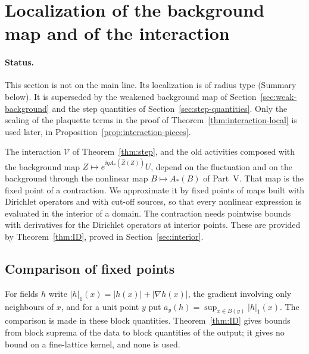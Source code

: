 \section{Localization of the background map and of the interaction}\label{sec:interaction-local}

\paragraph{Status.} This section is not on the main line. Its localization is of radius type (Summary below). It is superseded by the weakened background map of Section~\ref{sec:weak-background} and the step quantities of Section~\ref{sec:step-quantities}. Only the scaling of the plaquette terms in the proof of Theorem~\ref{thm:interaction-local} is used later, in Proposition~\ref{prop:interaction-pieces}.

The interaction $\mathcal V$ of Theorem~\ref{thm:step}, and the old activities composed with the background map $Z\mapsto e^{\ii\eta A_*(\hat Z(Z))}U$, depend on the fluctuation and on the background through the nonlinear map $B\mapsto A_*(B)$ of Part~V. That map is the fixed point of a contraction. We approximate it by fixed points of maps built with Dirichlet operators and with cut-off sources, so that every nonlinear expression is evaluated in the interior of a domain. The contraction needs pointwise bounds with derivatives for the Dirichlet operators at interior points. These are provided by Theorem~\ref{thm:ID}, proved in Section~\ref{sec:interior}.

\subsection{Comparison of fixed points}\label{ss:39.1}

For fields $h$ write $|h|_{1}(x)=|h(x)|+|\nabla h(x)|$, the gradient involving only neighbours of $x$, and for a unit point $y$ put $a_y(h)=\sup_{x\in B(y)}|h|_1(x)$. The comparison is made in these block quantities. Theorem~\ref{thm:ID} gives bounds from block suprema of the data to block quantities of the output; it gives no bound on a fine-lattice kernel, and none is used.

